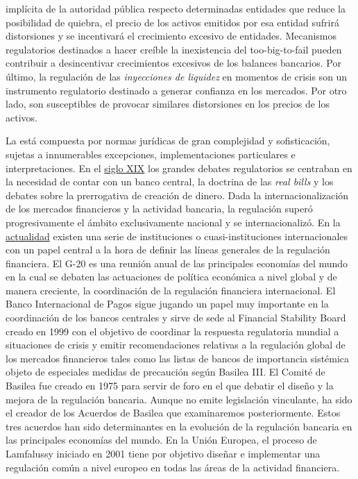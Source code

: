 \documentclass{nuevotema}
\begin{document}
implícita de la autoridad pública respecto determinadas entidades que reduce la posibilidad de quiebra, el precio de los activos emitidos por esa entidad sufrirá distorsiones y se incentivará el crecimiento excesivo de entidades. Mecanismos regulatorios destinados a hacer creíble la inexistencia del too-big-to-fail pueden contribuir a desincentivar crecimientos excesivos de los balances bancarios. Por último, la regulación de las \textit{inyecciones de liquidez} en momentos de crisis son un instrumento regulatorio destinado a generar confianza en los mercados. Por otro lado, son susceptibles de provocar similares distorsiones en los precios de los activos.

La  está compuesta por normas jurídicas de gran complejidad y sofisticación, sujetas a innumerables excepciones, implementaciones particulares e interpretaciones. En el \underline{siglo XIX} los grandes debates regulatorios se centraban en la necesidad de contar con un banco central, la doctrina de las \textit{real bills} y los debates sobre la prerrogativa de creación de dinero. Dada la internacionalización de los mercados financieros y la actividad bancaria, la regulación superó progresivamente el ámbito exclusivamente nacional y se internacionalizó. En la \underline{actualidad} existen una serie de instituciones o cuasi-instituciones internacionales con un papel central a la hora de definir las líneas generales de la regulación financiera. El G-20 es una reunión anual de las principales economías del mundo en la cual se debaten las actuaciones de política económica a nivel global y de manera creciente, la coordinación de la regulación financiera internacional. El Banco Internacional de Pagos sigue jugando un papel muy importante en la coordinación de los bancos centrales y sirve de sede al Financial Stability Board creado en 1999 con el objetivo de coordinar la respuesta regulatoria mundial a situaciones de crisis y emitir recomendaciones relativas a la regulación global de los mercados financieros tales como las listas de bancos de importancia sistémica objeto de especiales medidas de precaución según Basilea III. El Comité de Basilea fue creado en 1975 para servir de foro en el que debatir el diseño y la mejora de la regulación bancaria. Aunque no emite legislación vinculante, ha sido el creador de los Acuerdos de Basilea que examinaremos posteriormente. Estos tres acuerdos han sido determinantes en la evolución de la regulación bancaria en las principales economías del mundo. En la Unión Europea, el proceso de Lamfalussy iniciado en 2001 tiene por objetivo diseñar e implementar una regulación común a nivel europeo en todas las áreas de la actividad financiera. 
\end{document}
